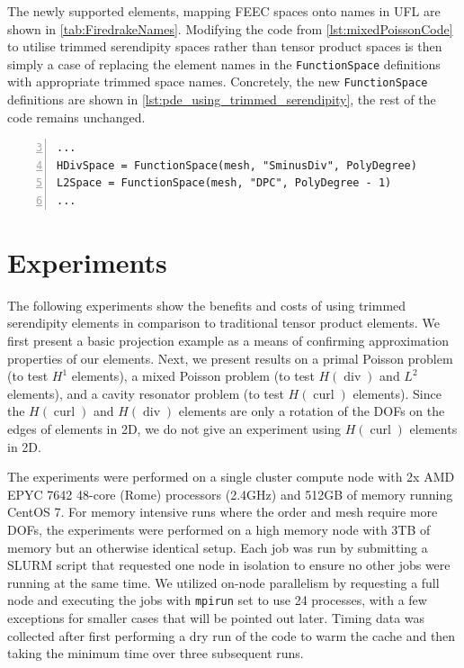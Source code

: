\documentclass[format=acmsmall,screen,timestamp=false,a4paper]{acmart}
\DeclareMathOperator{\Div}{div}
\DeclareMathOperator{\curl}{curl}
\newcommand\josh[1]{\textbf{\textcolor[rgb]{0,.5,1}{[Josh: #1]}}}
\newcommand\lm[1]{\textbf{\textcolor[rgb]{1,0,0.5}{[Lawrence: #1]}}}
\newcommand{\hcurl}{\ensuremath{{H}(\curl)}\xspace}
\newcommand{\hdiv}{\ensuremath{{H}(\Div)}\xspace}
\begin{document}
The newly supported elements, mapping FEEC spaces onto names in UFL are shown in \cref{tab:FiredrakeNames}. Modifying the code from \cref{lst:mixedPoissonCode} to utilise trimmed serendipity spaces rather than tensor product spaces is then simply a case of replacing the element names in the \texttt{FunctionSpace} definitions with appropriate trimmed space names. Concretely, the new \texttt{FunctionSpace} definitions are shown in \cref{lst:pde_using_trimmed_serendipity}, the rest of the code remains unchanged.
\begin{lstlisting}[float=htbp,caption={Setting up Firedrake to use the trimmed serendipity elements in a mixed Poisson problem in 3D.}, label={lst:pde_using_trimmed_serendipity}, numbers=left, firstnumber=3, xleftmargin=20pt,  xrightmargin=20pt]
...
HDivSpace = FunctionSpace(mesh, "SminusDiv", PolyDegree)
L2Space = FunctionSpace(mesh, "DPC", PolyDegree - 1)
...
\end{lstlisting}
 


  \section{Experiments}
    
The following experiments show the benefits and costs of using trimmed serendipity elements in comparison to traditional tensor product elements.  We first present a basic projection example as a means of confirming approximation properties of our elements.  Next, we present results on a primal Poisson problem (to test $H^1$ elements), a mixed Poisson problem (to test \hdiv and $L^2$ elements), and a cavity resonator problem (to test \hcurl elements).  Since the \hcurl and \hdiv elements are only a rotation of the DOFs on the edges of elements in 2D, we do not give an experiment using \hcurl elements in 2D. 

The experiments were performed on a single cluster compute node with 2x AMD EPYC 7642 48-core (Rome) processors (2.4GHz) and 512GB of memory running CentOS 7.  For memory intensive runs where the order and mesh require more DOFs, the experiments were performed on a high memory node with 3TB of memory but an otherwise identical setup.  Each job was run by submitting a SLURM script that requested one node in isolation to ensure no other jobs were running at the same time.  We utilized on-node parallelism by requesting a full node and executing the jobs with \texttt{mpirun} set to use 24 processes, with a few exceptions for smaller cases that will be pointed out later.  Timing data was collected after first performing a dry run of the code to warm the cache and then taking the minimum time over three subsequent runs.  
\end{document}

